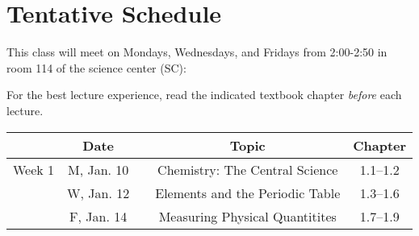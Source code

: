 \documentclass[12pt, letterpaper]{article}
\begin{document}
\section*{Tentative Schedule}
This class will meet on Mondays, Wednesdays, and Fridays from 2:00-2:50 in room 114 of the science center (SC):

\noindent For the best lecture experience, read the indicated textbook chapter \emph{before} each lecture.

\noindent
\begin{tabular}{rcccc}
	& Date && Topic & Chapter\\
	\midrule
	Week 1 & M, Jan. 10&& Chemistry: The Central Science & 1.1--1.2\\
	& W, Jan. 12&& Elements and the Periodic Table & 1.3--1.6\\
	& F, Jan. 14&& Measuring Physical Quantitites & 1.7--1.9\\
\end{tabular}
\end{document}

